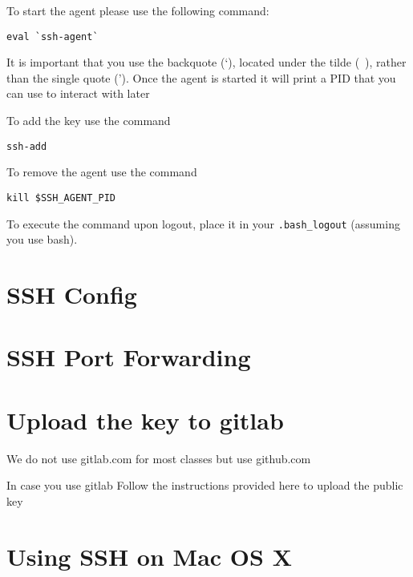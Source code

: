 To start the agent please use the following command:

\begin{verbatim}
eval `ssh-agent`
\end{verbatim}

It is important that you use the backquote (`), located under the
tilde (~), rather than the single quote ('). Once the agent is started
it will print a PID that you can use to interact with later

To add the key use the command

\begin{verbatim}
ssh-add
\end{verbatim}

To remove the agent use the command

\begin{verbatim}
kill $SSH_AGENT_PID
\end{verbatim}

To execute the command upon logout, place it in your 
\verb|.bash_logout| (assuming you use bash).


\section{SSH Config}


\section{SSH Port Forwarding}


\section{Upload the key to gitlab}\label{upload-the-key-to-gitlab}

\begin{IU}
We do not use gitlab.com for most classes but use github.com
\end{IU}

In case you use gitlab  Follow the instructions provided here to
upload the public key


\section{Using SSH on Mac OS X}\label{using-ssh-on-mac-os-x}

